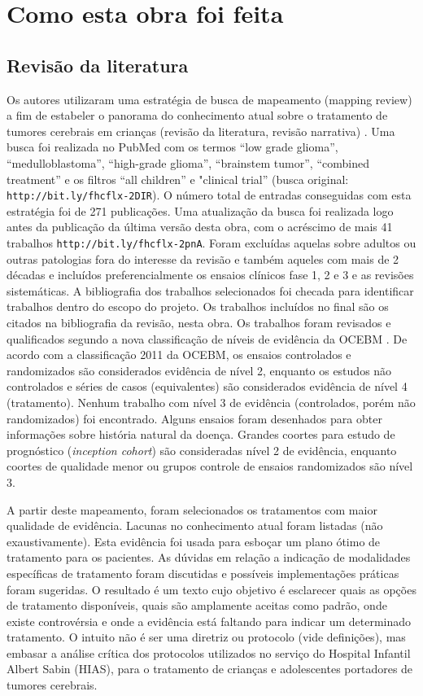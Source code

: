 \documentclass[11pt,a4paper,oldfontcommands]{memoir}
\begin{document}
\section{Como esta obra foi feita}

\subsection{Revisão da literatura}
Os autores utilizaram uma estratégia de busca de mapeamento (mapping review) a fim de estabeler o panorama do conhecimento atual sobre o tratamento de tumores cerebrais em crianças (revisão da literatura, revisão narrativa) \cite{grant,vosgerau}. Uma busca foi realizada no PubMed com os termos “low grade glioma”, “medulloblastoma”, “high-grade glioma”, “brainstem tumor”, “combined treatment” e os filtros “all children” e "clinical trial” (busca original: \texttt{http://bit.ly/fhcflx-2DIR}). O número total de entradas conseguidas com esta estratégia foi de 271 publicações. Uma atualização da busca foi realizada logo antes da publicação da última versão desta obra, com o acréscimo de mais 41 trabalhos \texttt{http://bit.ly/fhcflx-2pnA}. Foram excluídas aquelas sobre adultos ou outras patologias fora do interesse da revisão e também aqueles com mais de 2 décadas e incluídos preferencialmente os ensaios clínicos fase 1, 2 e 3 e as revisões sistemáticas. A bibliografia dos trabalhos selecionados foi checada para identificar trabalhos dentro do escopo do projeto. Os trabalhos incluídos no final são os citados na bibliografia da revisão, nesta obra. Os trabalhos foram revisados e qualificados segundo a nova classificação de níveis de evidência da OCEBM \cite{ocebm}. De acordo com a classificação 2011 da OCEBM, os ensaios controlados e randomizados são considerados evidência de nível 2, enquanto os estudos não controlados e séries de casos (equivalentes) são considerados evidência de nível 4 (tratamento). Nenhum trabalho com nível 3 de evidência (controlados, porém não randomizados) foi encontrado. Alguns ensaios foram desenhados para obter informações sobre história natural da doença. Grandes coortes para estudo de prognóstico (\textit{inception cohort}) são consideradas nível 2 de evidência, enquanto coortes de qualidade menor ou grupos controle de ensaios randomizados são nível 3.

A partir deste mapeamento, foram selecionados os tratamentos com maior qualidade de evidência. Lacunas no conhecimento atual foram listadas (não exaustivamente). Esta evidência foi usada para esboçar um plano ótimo de tratamento para os pacientes. As dúvidas em relação a indicação de modalidades específicas de tratamento foram discutidas e possíveis implementações práticas foram sugeridas. O resultado é um texto cujo objetivo é esclarecer quais as opções de tratamento disponíveis, quais são amplamente aceitas como padrão, onde existe controvérsia e onde a evidência está faltando para indicar um determinado tratamento. O intuito não é ser uma diretriz ou protocolo (vide definições), mas embasar a análise crítica dos protocolos utilizados no serviço do Hospital Infantil Albert Sabin (HIAS), para o tratamento de crianças e adolescentes portadores de tumores cerebrais.
\end{document}
